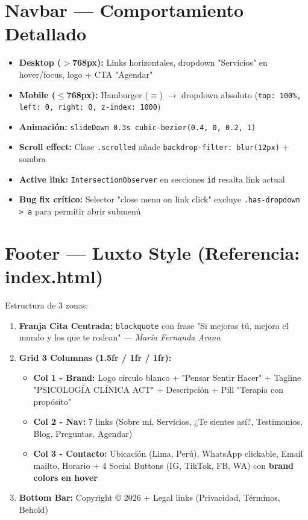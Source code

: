 \documentclass[12pt,a4paper,spanish]{report}
\begin{document}
\section{Navbar — Comportamiento Detallado}
\begin{itemize}
    \item \textbf{Desktop ($>$768px):} Links horizontales, dropdown "Servicios" en hover/focus, logo + CTA "Agendar"
    \item \textbf{Mobile ($\leq$768px):} Hamburger ($\equiv$) $\rightarrow$ dropdown absoluto (\texttt{top: 100\%, left: 0, right: 0, z-index: 1000})
    \item \textbf{Animación:} \texttt{slideDown 0.3s cubic-bezier(0.4, 0, 0.2, 1)}
    \item \textbf{Scroll effect:} Clase \texttt{.scrolled} añade \texttt{backdrop-filter: blur(12px)} + sombra
    \item \textbf{Active link:} \texttt{IntersectionObserver} en secciones \texttt{id} resalta link actual
    \item \textbf{Bug fix crítico:} Selector "close menu on link click" excluye \texttt{.has-dropdown > a} para permitir abrir submenú
\end{itemize}

\section{Footer — Luxto Style (Referencia: index.html)}
Estructura de 3 zonas:

\begin{enumerate}
    \item \textbf{Franja Cita Centrada:} \texttt{blockquote} con frase "Si mejoras tú, mejora el mundo y los que te rodean" — \textit{María Fernanda Arana}
    \item \textbf{Grid 3 Columnas (1.5fr / 1fr / 1fr):}
    \begin{itemize}
        \item \textbf{Col 1 - Brand:} Logo círculo blanco + "Pensar Sentir Hacer" + Tagline "PSICOLOGÍA CLÍNICA ACT" + Descripción + Pill "Terapia con propósito"
        \item \textbf{Col 2 - Nav:} 7 links (Sobre mí, Servicios, ¿Te sientes así?, Testimonios, Blog, Preguntas, Agendar)
        \item \textbf{Col 3 - Contacto:} Ubicación (Lima, Perú), WhatsApp clickable, Email mailto, Horario + 4 Social Buttons (IG, TikTok, FB, WA) con \textbf{brand colors en hover}
    \end{itemize}
    \item \textbf{Bottom Bar:} Copyright © 2026 + Legal links (Privacidad, Términos, Behold)
\end{enumerate}
\end{document}
